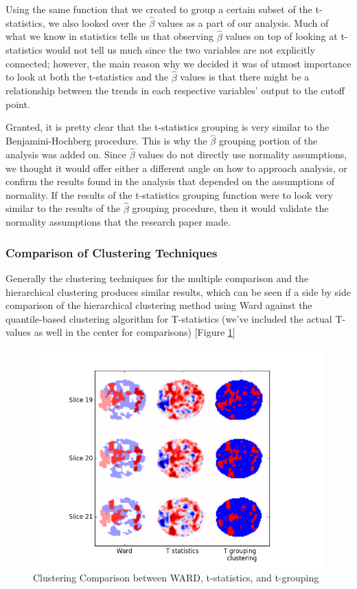 \par Using the same function that we created to group a certain subset of the 
t-statistics, we also looked over the $\hat{\beta}$ values as a part of our 
analysis. Much of what we know in statistics tells us that observing 
$\hat{\beta}$ values on top of looking at t-statistics would not tell us much 
since the two variables are not explicitly connected; however, the main reason 
why we decided it was of utmost importance to look at both the t-statistics 
and the $\hat{\beta}$ values is that there might be a relationship between the 
trends in each respective variables' output to the cutoff point. 

\par Granted, it is pretty clear that the t-statistics grouping is very similar
to the Benjamini-Hochberg procedure. This is why the $\hat{\beta}$ grouping 
portion of the analysis was added on. Since $\hat{\beta}$ values do not 
directly use normality assumptions, we thought it would offer either a 
different angle on how to approach analysis, or confirm the results found in 
the analysis that depended on the assumptions of normality. If the results of
the t-statistics grouping function were to look very similar to the results of
the $\hat{\beta}$ grouping procedure, then it would validate the normality 
assumptions that the research paper made. 

\subsubsection{Comparison of Clustering Techniques}
Generally the clustering techniques for the multiple comparison and the 
hierarchical clustering produces similar results, which can be seen if a 
side by side comparison of the hierarchical clustering method using Ward
against the quantile-based clustering algorithm for T-statistics (we've
included the actual T-values as well in the center for comparisons) 
[Figure \ref{fig:cluster_comparison}]



\begin{figure}[ht]

	\centering
	\includegraphics[width=.8\linewidth]{../images/cluster_comparison.png} 
	\caption{Clustering Comparison between WARD, t-statistics, and t-grouping}
	\label{fig:cluster_comparison}

\end{figure}
